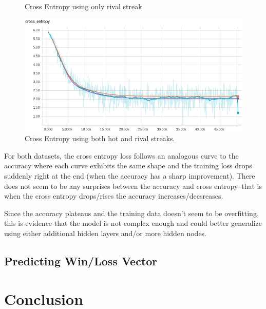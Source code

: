 \documentclass{article} %
\begin{document}
\begin{figure}[!htb]
  \caption{Cross Entropy using only rival streak.}\label{fig:wteam-onehot-r-crossentropy}
\endminipage
{}%
  \includegraphics[width=\linewidth]{plots/model1/wteam_onehot/streak-hr/crossentropy.png}
  \caption{Cross Entropy using both hot and rival streaks.}\label{fig:wteam-onehot-hr-crossentropy}
\endminipage
\end{figure}
For both datasets, the cross entropy loss follows an analogous curve to the accuracy where each curve exhibits the same shape and the training loss drops suddenly right at the end (when the accuracy has a sharp improvement).  There does not seem to be any surprises between the accuracy and cross entropy--that is when the cross entropy drops/rises the accuracy increases/decsreases.


Since the accuracy plateaus and the training data doesn't seem to be overfitting, this is evidence that the model is not complex enough and could better generalize using either additional hidden layers and/or more hidden nodes.



\subsection{Predicting Win/Loss Vector}
\label{sec:results-winloss-vector}

\section{Conclusion}
\label{sec:conclusion}


\small{
\nocite{*}


}
\end{document}
